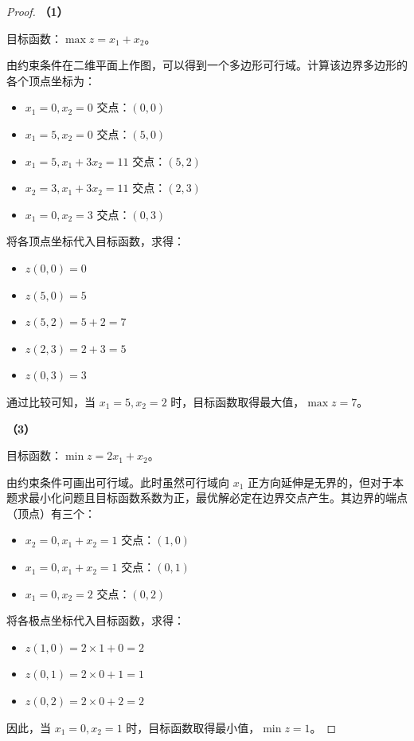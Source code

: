 \documentclass[11pt, a4paper]{article}
\begin{document}
\begin{proof}
    \textbf{（1）}

    目标函数：$\max z = x_1 + x_2$。

    由约束条件在二维平面上作图，可以得到一个多边形可行域。计算该边界多边形的各个顶点坐标为：
    \begin{itemize}
        \item $x_1=0, x_2=0$ 交点：$(0, 0)$
        \item $x_1=5, x_2=0$ 交点：$(5, 0)$
        \item $x_1=5, x_1+3x_2=11$ 交点：$(5, 2)$
        \item $x_2=3, x_1+3x_2=11$ 交点：$(2, 3)$
        \item $x_1=0, x_2=3$ 交点：$(0, 3)$
    \end{itemize}

    将各顶点坐标代入目标函数，求得：
    \begin{itemize}
        \item $z(0, 0) = 0$
        \item $z(5, 0) = 5$
        \item $z(5, 2) = 5 + 2 = 7$
        \item $z(2, 3) = 2 + 3 = 5$
        \item $z(0, 3) = 3$
    \end{itemize}
    通过比较可知，当 $x_1 = 5, x_2 = 2$ 时，目标函数取得最大值，$\max z = 7$。

    \vspace{1em}
    \textbf{（3）}

    目标函数：$\min z = 2x_1 + x_2$。

    由约束条件可画出可行域。此时虽然可行域向 $x_1$ 正方向延伸是无界的，但对于本题求最小化问题且目标函数系数为正，最优解必定在边界交点产生。其边界的端点（顶点）有三个：
    \begin{itemize}
        \item $x_2=0, x_1+x_2=1$ 交点：$(1, 0)$
        \item $x_1=0, x_1+x_2=1$ 交点：$(0, 1)$
        \item $x_1=0, x_2=2$ 交点：$(0, 2)$
    \end{itemize}

    将各极点坐标代入目标函数，求得：
    \begin{itemize}
        \item $z(1, 0) = 2 \times 1 + 0 = 2$
        \item $z(0, 1) = 2 \times 0 + 1 = 1$
        \item $z(0, 2) = 2 \times 0 + 2 = 2$
    \end{itemize}
    因此，当 $x_1 = 0, x_2 = 1$ 时，目标函数取得最小值，$\min z = 1$。
\end{proof}
\end{document}

